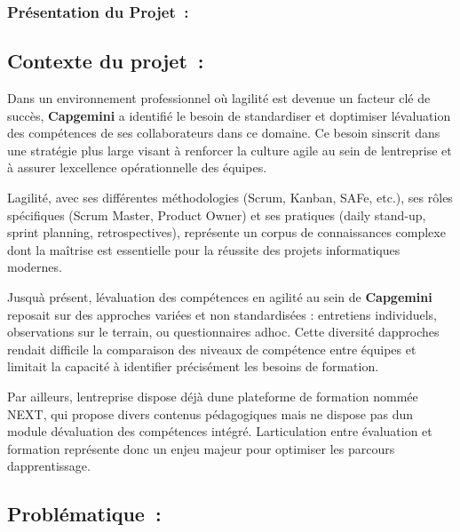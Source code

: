 \documentclass[12pt,a4paper,twoside,openright]{report}
\begin{document}
\hypertarget{pruxe9sentation-du-projet}{%
\subsubsection{Présentation du
Projet~:}\label{pruxe9sentation-du-projet}}

\hypertarget{contexte-du-projet}{%
\subsection{Contexte du projet~:}\label{contexte-du-projet}}

Dans un environnement professionnel où l\textquotesingle agilité est
devenue un facteur clé de succès, \textbf{Capgemini} a identifié le
besoin de standardiser et d\textquotesingle optimiser
l\textquotesingle évaluation des compétences de ses collaborateurs dans
ce domaine. Ce besoin s\textquotesingle inscrit dans une stratégie plus
large visant à renforcer la culture agile au sein de
l\textquotesingle entreprise et à assurer l\textquotesingle excellence
opérationnelle des équipes.

L\textquotesingle agilité, avec ses différentes méthodologies (Scrum,
Kanban, SAFe, etc.), ses rôles spécifiques (Scrum Master, Product Owner)
et ses pratiques (daily stand-up, sprint planning, retrospectives),
représente un corpus de connaissances complexe dont la maîtrise est
essentielle pour la réussite des projets informatiques modernes.

Jusqu\textquotesingle à présent, l\textquotesingle évaluation des
compétences en agilité au sein de \textbf{Capgemini} reposait sur des
approches variées et non standardisées : entretiens individuels,
observations sur le terrain, ou questionnaires adhoc. Cette diversité
d\textquotesingle approches rendait difficile la comparaison des niveaux
de compétence entre équipes et limitait la capacité à identifier
précisément les besoins de formation.

Par ailleurs, l\textquotesingle entreprise dispose déjà
d\textquotesingle une plateforme de formation nommée NEXT, qui propose
divers contenus pédagogiques mais ne dispose pas d\textquotesingle un
module d\textquotesingle évaluation des compétences intégré.
L\textquotesingle articulation entre évaluation et formation représente
donc un enjeu majeur pour optimiser les parcours
d\textquotesingle apprentissage.

\hypertarget{problematique}{%
\subsection{Problématique~:}\label{problematique}}
\end{document}
